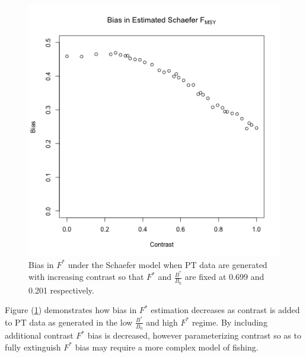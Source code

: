 \documentclass[12pt]{article}
\begin{document}
%
\begin{figure}
\begin{minipage}[h!]{0.49\textwidth}
\includegraphics[width=\textwidth]{../ptNew/contrastTest.png}
\end{minipage}
\begin{minipage}[h!]{0.49\textwidth}
\caption{
Bias in $F^*$ under the Schaefer model when PT data are generated 
with increasing contrast so that $F^*$ and $\frac{B^*}{B_0}$ are fixed at 
0.699 and 0.201 respectively. %
}
\end{minipage}
\label{conTest}
\end{figure}

%
Figure (\ref{conTest}) demonstrates how bias in $F^*$ estimation %
decreases as contrast is added to PT data as generated in the low $\frac{B^*}{B_0}$ and 
high $F^*$ regime. By including additional contrast $F^*$ bias is decreased, however
parameterizing contrast so as to fully extinguish $F^*$ bias may require a more complex 
model of fishing.
\end{document}
